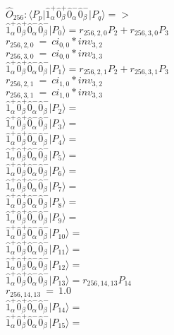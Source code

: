 \documentclass[14pt]{article}
\begin{document}
    $\hat{O}_{256}:  \langle{P_p}\vert \hat{1}_{\alpha}^{+}\hat{0}_{\beta}^{+}\hat{0}_{\alpha}^{-}\hat{0}_{\beta}^{-} \vert{P_q}\rangle => $ \\ 
    $ \hat{1}_{\alpha}^{+}\hat{0}_{\beta}^{+}\hat{0}_{\alpha}^{-}\hat{0}_{\beta}^{-} \vert{P_{0}}\rangle = {r}_{256,2,0}P_{2}+{r}_{256,3,0}P_{3} $ \\ 
    ${r}_{256,2,0}\ =\ {ci}_{0,0}*{inv}_{3,2} $ \\ 
    ${r}_{256,3,0}\ =\ {ci}_{0,0}*{inv}_{3,3} $ \\ 
    $ \hat{1}_{\alpha}^{+}\hat{0}_{\beta}^{+}\hat{0}_{\alpha}^{-}\hat{0}_{\beta}^{-} \vert{P_{1}}\rangle = {r}_{256,2,1}P_{2}+{r}_{256,3,1}P_{3} $ \\ 
    ${r}_{256,2,1}\ =\ {ci}_{1,0}*{inv}_{3,2} $ \\ 
    ${r}_{256,3,1}\ =\ {ci}_{1,0}*{inv}_{3,3} $ \\ 
    $ \hat{1}_{\alpha}^{+}\hat{0}_{\beta}^{+}\hat{0}_{\alpha}^{-}\hat{0}_{\beta}^{-} \vert{P_{2}}\rangle =  $ \\ 
    $ \hat{1}_{\alpha}^{+}\hat{0}_{\beta}^{+}\hat{0}_{\alpha}^{-}\hat{0}_{\beta}^{-} \vert{P_{3}}\rangle =  $ \\ 
    $ \hat{1}_{\alpha}^{+}\hat{0}_{\beta}^{+}\hat{0}_{\alpha}^{-}\hat{0}_{\beta}^{-} \vert{P_{4}}\rangle =  $ \\ 
    $ \hat{1}_{\alpha}^{+}\hat{0}_{\beta}^{+}\hat{0}_{\alpha}^{-}\hat{0}_{\beta}^{-} \vert{P_{5}}\rangle =  $ \\ 
    $ \hat{1}_{\alpha}^{+}\hat{0}_{\beta}^{+}\hat{0}_{\alpha}^{-}\hat{0}_{\beta}^{-} \vert{P_{6}}\rangle =  $ \\ 
    $ \hat{1}_{\alpha}^{+}\hat{0}_{\beta}^{+}\hat{0}_{\alpha}^{-}\hat{0}_{\beta}^{-} \vert{P_{7}}\rangle =  $ \\ 
    $ \hat{1}_{\alpha}^{+}\hat{0}_{\beta}^{+}\hat{0}_{\alpha}^{-}\hat{0}_{\beta}^{-} \vert{P_{8}}\rangle =  $ \\ 
    $ \hat{1}_{\alpha}^{+}\hat{0}_{\beta}^{+}\hat{0}_{\alpha}^{-}\hat{0}_{\beta}^{-} \vert{P_{9}}\rangle =  $ \\ 
    $ \hat{1}_{\alpha}^{+}\hat{0}_{\beta}^{+}\hat{0}_{\alpha}^{-}\hat{0}_{\beta}^{-} \vert{P_{10}}\rangle =  $ \\ 
    $ \hat{1}_{\alpha}^{+}\hat{0}_{\beta}^{+}\hat{0}_{\alpha}^{-}\hat{0}_{\beta}^{-} \vert{P_{11}}\rangle =  $ \\ 
    $ \hat{1}_{\alpha}^{+}\hat{0}_{\beta}^{+}\hat{0}_{\alpha}^{-}\hat{0}_{\beta}^{-} \vert{P_{12}}\rangle =  $ \\ 
    $ \hat{1}_{\alpha}^{+}\hat{0}_{\beta}^{+}\hat{0}_{\alpha}^{-}\hat{0}_{\beta}^{-} \vert{P_{13}}\rangle = {r}_{256,14,13}P_{14} $ \\ 
    ${r}_{256,14,13}\ =\ 1.0 $ \\ 
    $ \hat{1}_{\alpha}^{+}\hat{0}_{\beta}^{+}\hat{0}_{\alpha}^{-}\hat{0}_{\beta}^{-} \vert{P_{14}}\rangle =  $ \\ 
    $ \hat{1}_{\alpha}^{+}\hat{0}_{\beta}^{+}\hat{0}_{\alpha}^{-}\hat{0}_{\beta}^{-} \vert{P_{15}}\rangle =  $ \\ 
    
\end{document}

